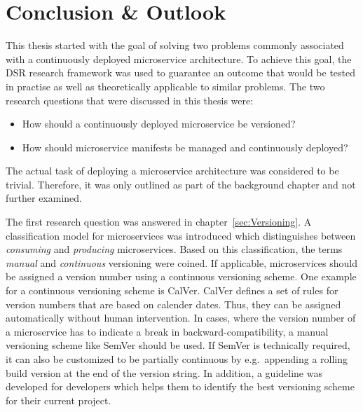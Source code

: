 
\section{Conclusion \& Outlook}%
\label{sec:Conclusion}

This thesis started with the goal of solving two problems commonly associated
with a continuously deployed microservice architecture. To achieve this goal,
the \ac{DSR} research framework was used to guarantee an outcome that would be
tested in practise as well as theoretically applicable to similar problems. The
two research questions that were discussed in this thesis were:

\begin{itemize}
  \item How should a continuously deployed microservice be versioned?
  \item How should microservice manifests be managed and continuously deployed?
\end{itemize}

The actual task of deploying a microservice architecture was considered to be
trivial. Therefore, it was only outlined as part of the background chapter and
not further examined.

The first research question was answered in chapter~\ref{sec:Versioning}. A
classification model for microservices was introduced which distinguishes
between \textit{consuming} and \textit{producing} microservices. Based on this
classification, the terms \textit{manual} and \textit{continuous} versioning
were coined. If applicable, microservices should be assigned a version number
using a continuous versioning scheme. One example for a continuous versioning
scheme is CalVer. CalVer defines a set of rules for version numbers that are
based on calender dates. Thus, they can be assigned automatically without human
intervention. In cases, where the version number of a microservice has to
indicate a break in backward-compatibility, a manual versioning scheme like
SemVer should be used. If SemVer is technically required, it can also be
customized to be partially continuous by e.g.\ appending a rolling build
version at the end of the version string. In addition, a guideline was
developed for developers which helps them to identify the best versioning
scheme for their current project.

